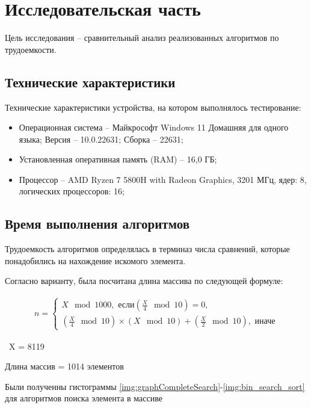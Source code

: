 \chapter{Исследовательская часть}

Цель исследования -- сравнительный анализ реализованных алгоритмов по трудоемкости.


\section{Технические характеристики}
Технические характеристики устройства, на котором выполнялось тестирование:
\begin{itemize}
	\item {Операционная система – Майкрософт Windows 11 Домашняя для одного языка; Версия -- 10.0.22631; Сборка -- 22631;}
	\item {Установленная оперативная память (RAM) -- 16,0 ГБ;}
	\item {Процессор -- AMD Ryzen 7 5800H with Radeon Graphics, 3201 МГц, ядер: 8, логических процессоров: 16;}
\end{itemize}

\section{Время выполнения алгоритмов}
Трудоемкость алгоритмов определялась в терминаз числа сравнений, которые понадобились на нахождение искомого элемента.

Согласно варианту, была посчитана длина массива по следующей формуле:

\begin{align}
	n = 
	\begin{cases}
		X \mod 1000, \text{ если} \left( \frac{X}{4} \mod 10 \right) = 0, \\
		\left( \frac{X}{4} \mod 10 \right) \times (X \mod 10) + \left( \frac{X}{2} \mod 10 \right), \text{ иначе}
	\end{cases}
	\tag{4.1} \label{eq:formula}
\end{align}

 \ X = 8119

Длина массив = 1014 элементов

Были полученны гистограммы \ref{img:graphCompleteSearch}-\ref{img:bin_search_sort} для алгоритмов поиска элемента в массиве


\clearpage
{}



